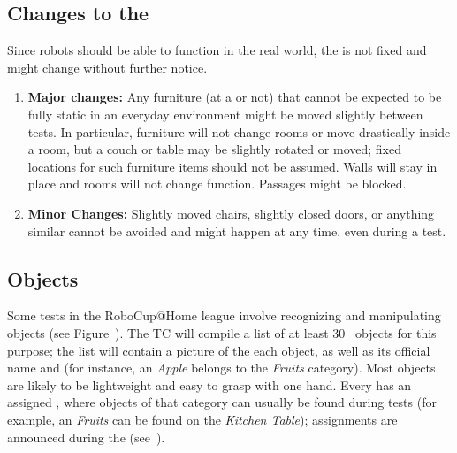 \subsection{Changes to the \Arena}\label{rule:scenario_changes}

Since robots should be able to function in the real world, the \Arena{} is not fixed and might change without further notice.
\begin{enumerate}
	\item \textbf{Major changes:}
	Any furniture (at a \PredefinedLocation{} or not) that cannot be expected to be fully static in an everyday environment might be moved slightly between tests.
	In particular, furniture will not change rooms or move drastically inside a room, but a couch or table may be slightly rotated or moved; fixed locations for such furniture items should not be assumed.
	Walls will stay in place and rooms will not change function.
	Passages might be blocked.
	\item \textbf{Minor Changes:} Slightly moved chairs, slightly closed doors, or anything similar cannot be avoided and might happen at any time, even during a test.
\end{enumerate}


%
%
%
\def\NumObjects{30\ }
\def\NumLocations{20\ }
\def\NumNames{20\ }

\subsection{Objects}\label{rule:scenario_objects}

Some tests in the RoboCup@Home league involve recognizing and manipulating objects (see Figure~).
The TC will compile a list of at least \NumObjects{} objects for this purpose; the list will contain a picture of the each object, as well as its official name and \ObjectCategory{} (for instance, an \textit{Apple} belongs to the \textit{Fruits} category).
Most objects are likely to be lightweight and easy to grasp with one hand.
Every \ObjectCategory{} has an assigned \PredefinedLocation, where objects of that category can usually be found during tests (for example, an \textit{Fruits} can be found on the \textit{Kitchen Table}); assignments are announced during the \SetupDays{} (see~).

